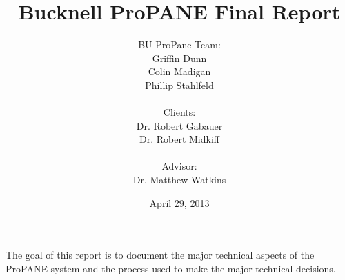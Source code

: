 \documentclass[]{article}
\begin{document}
	\begin{titlepage}



		\title{\textbf{Bucknell ProPANE Final Report}}
		\author{BU ProPane Team:\\Griffin Dunn\\Colin Madigan\\Phillip Stahlfeld\\\\Clients:\\Dr. Robert Gabauer\\Dr. Robert Midkiff\\\\Advisor:\\Dr. Matthew Watkins}
		\date{April 29, 2013}
		\maketitle



		
		
		\thispagestyle{empty}
		\noindent
		The goal of this report is to document the major technical aspects of the ProPANE system and the process used to make the major technical decisions. 
		
		
		
	\end{titlepage}
	
	\thispagestyle{empty}
	
	
	\tableofcontents
	\newpage
	
	
	\setcounter{page}{1}
	\thispagestyle{empty}
	
\end{document}
